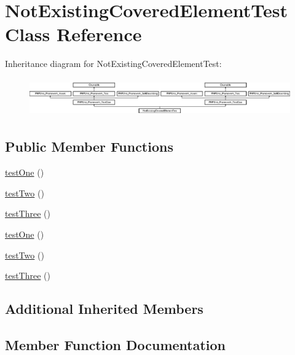 \hypertarget{class_not_existing_covered_element_test}{}\section{Not\+Existing\+Covered\+Element\+Test Class Reference}
\label{class_not_existing_covered_element_test}
Inheritance diagram for Not\+Existing\+Covered\+Element\+Test\+:\begin{figure}[H]
\begin{center}
\leavevmode
\includegraphics[height=1.651917cm]{class_not_existing_covered_element_test}
\end{center}
\end{figure}
\subsection*{Public Member Functions}
\begin{DoxyCompactItemize}
\item 
\mbox{\hyperlink{class_not_existing_covered_element_test_afbf3ff88b322c6a7197ce02297cd23a0}{test\+One}} ()
\item 
\mbox{\hyperlink{class_not_existing_covered_element_test_a4fb9974ce113d5d1db8075e0db0dc9b6}{test\+Two}} ()
\item 
\mbox{\hyperlink{class_not_existing_covered_element_test_a0bd6c752e665cd0e690512ca38d15d41}{test\+Three}} ()
\item 
\mbox{\hyperlink{class_not_existing_covered_element_test_afbf3ff88b322c6a7197ce02297cd23a0}{test\+One}} ()
\item 
\mbox{\hyperlink{class_not_existing_covered_element_test_a4fb9974ce113d5d1db8075e0db0dc9b6}{test\+Two}} ()
\item 
\mbox{\hyperlink{class_not_existing_covered_element_test_a0bd6c752e665cd0e690512ca38d15d41}{test\+Three}} ()
\end{DoxyCompactItemize}
\subsection*{Additional Inherited Members}


\subsection{Member Function Documentation}
\mbox{\label{class_not_existing_covered_element_test_afbf3ff88b322c6a7197ce02297cd23a0}} 
